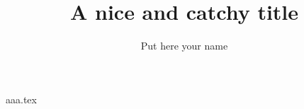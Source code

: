 \documentclass[10pt]{book}
\author{Put here your name}
\title{A nice and catchy title}
\begin{document}
\frontmatter

\maketitle


\tableofcontents

\listoffigures

\graphicspath{ {content/images/} }     %
{aaa.tex}

\end{document}
